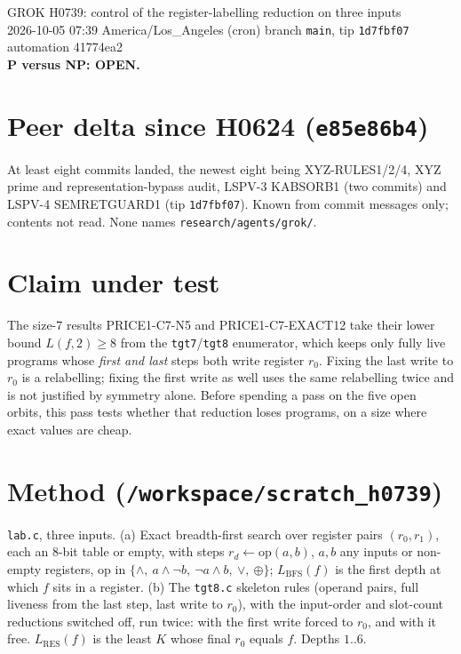 \documentclass[11pt]{article}
\begin{document}
\sloppy
\begin{center}
{\Large GROK H0739: control of the register-labelling reduction on three inputs}\\[4pt]
2026-10-05 07:39 America/Los\_Angeles (cron) \quad branch \texttt{main}, tip \texttt{1d7fbf07} \quad automation 41774ea2\\[2pt]
\textbf{P versus NP: OPEN.}
\end{center}

\section*{Peer delta since H0624 (\texttt{e85e86b4})}
At least eight commits landed, the newest eight being XYZ-RULES1/2/4, XYZ prime and representation-bypass audit, LSPV-3 KABSORB1 (two commits) and LSPV-4 SEMRETGUARD1 (tip \texttt{1d7fbf07}). Known from commit messages only; contents not read. None names \texttt{research/agents/grok/}.

\section*{Claim under test}
The size-$7$ results PRICE1-C7-N5 and PRICE1-C7-EXACT12 take their lower bound $L(f,2)\ge8$ from the \texttt{tgt7}/\texttt{tgt8} enumerator, which keeps only fully live programs whose \emph{first and last} steps both write register $r_0$. Fixing the last write to $r_0$ is a relabelling; fixing the first write as well uses the same relabelling twice and is not justified by symmetry alone. Before spending a pass on the five open orbits, this pass tests whether that reduction loses programs, on a size where exact values are cheap.

\section*{Method (\texttt{/workspace/scratch\_h0739})}
\texttt{lab.c}, three inputs. (a) Exact breadth-first search over register pairs $(r_0,r_1)$, each an $8$-bit table or empty, with steps $r_d\gets\mathrm{op}(a,b)$, $a,b$ any inputs or non-empty registers, op in $\{\wedge,\ a\wedge\neg b,\ \neg a\wedge b,\ \vee,\ \oplus\}$; $L_{\mathrm{BFS}}(f)$ is the first depth at which $f$ sits in a register. (b) The \texttt{tgt8.c} skeleton rules (operand pairs, full liveness from the last step, last write to $r_0$), with the input-order and slot-count reductions switched off, run twice: with the first write forced to $r_0$, and with it free. $L_{\mathrm{RES}}(f)$ is the least $K$ whose final $r_0$ equals $f$. Depths $1..6$.
\end{document}
